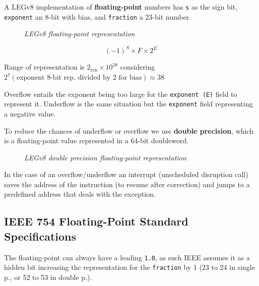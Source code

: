 \documentclass[11pt]{article}
\begin{document}
A LEGv8 implementation of \textbf{floating-point} numbers has \texttt{s} as the sign bit, \texttt{exponent} an 8-bit with bias, and \texttt{fraction} a 23-bit number.

\begin{figure}[htbp]
    \centering
    \caption{\textit{LEGv8 floating-point representation}}
\end{figure}
\vspace{-2em}
$$(-1)^S \times F \times 2^E$$

Range of representation is $2_{\text{ten}} \times 10^{38}$ considering $2^7 (\text{exponent 8-bit rep. divided by 2 for bias}) \approx 38$

Overflow entails the exponent being too large for the \texttt{exponent (E)} field to represent it. Underflow is the same situation but the \texttt{exponent} field representing a negative value.

To reduce the chances of underflow or overflow we use \textbf{double precision}, which is a floating-point value represented in a 64-bit doubleword.

\begin{figure}[htbp]
    \centering
    \caption{\textit{LEGv8 double precision floating-point representation}}
\end{figure}

In the case of an overflow/underflow an interrupt (unscheduled disruption call) saves the address of the instruction (to resume after correction) and jumps to a predefined address that deals with the exception.

\subsection*{IEEE 754 Floating-Point Standard Specifications}

The floating-point can always have a leading \texttt{1.0}, as such IEEE assumes it as a hidden bit increasing the representation for the \texttt{fraction} by 1 (23 to 24 in single p., or 52 to 53 in double p.).
\end{document}
